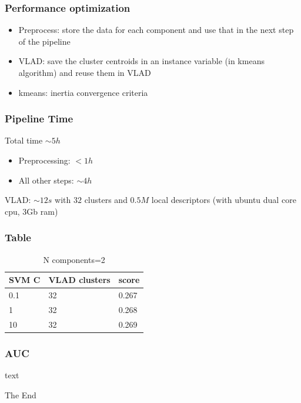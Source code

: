 \documentclass{beamer}
\begin{document}
\begin{frame}
\frametitle{Performance optimization}
\begin{itemize}
\item Preprocess:  store the data for each component and use that in the next step of the pipeline
\item VLAD: save the cluster centroids in an instance variable (in kmeans algorithm) and reuse them in VLAD
\item kmeans: inertia convergence criteria 
\end{itemize} 
\end{frame}



\begin{frame}
\frametitle{Pipeline Time}
Total time $ \sim   5h$ 
\begin{itemize}
\item Preprocessing: $< 1h$
\item All other steps:  $\sim4h$ 
\end{itemize}
VLAD:  $ \sim   12s$ with $32$ clusters and $0.5M$ local descriptors (with ubuntu dual core cpu, 3Gb ram)
\end{frame}








\begin{frame}
\frametitle{Table}
\begin{table}
\begin{tabular}{l l l}
\toprule
\textbf{ SVM C} & \textbf{VLAD clusters} & \textbf{score} \\
\midrule
0.1 & 32 & 0.267\\
1 & 32 & 0.268\\
10 & 32 & 0.269\\
\bottomrule
\end{tabular}
\caption{N components=2}
\end{table}
\end{frame}


\begin{frame}
\frametitle{AUC}
text
\end{frame}




\begin{frame}
\Huge{\centerline{The End}}
\end{frame}
\end{document}
